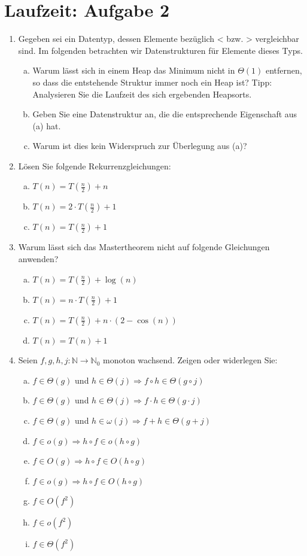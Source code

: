 \documentclass{scrartcl}
\begin{document}
\section*{Laufzeit: Aufgabe 2}
\begin{enumerate}[(1)]

\item Gegeben sei ein Datentyp, dessen Elemente bez\"uglich < bzw. > vergleichbar sind. Im folgenden betrachten wir Datenstrukturen f\"ur Elemente dieses Typs.
\begin{enumerate}[(a)]
\item Warum l\"asst sich in einem Heap das Minimum nicht in $\Theta(1)$ entfernen, so dass die entstehende Struktur immer noch ein Heap ist? \newline
Tipp: Analysieren Sie die Laufzeit des sich ergebenden Heapsorts.
\item Geben Sie eine Datenstruktur an, die die entsprechende Eigenschaft aus (a) hat.
\item Warum ist dies kein Widerspruch zur \"Uberlegung aus (a)?
\end{enumerate}

\item L\"osen Sie folgende Rekurrenzgleichungen:
\begin{enumerate}[(a)]
\item $T(n)=T(\frac{n}{2})+n$
\item $T(n)=2\cdot T(\frac{n}{2})+1$
\item $T(n)=T(\frac{n}{2})+1$
\end{enumerate}

\item Warum l\"asst sich das Mastertheorem nicht auf folgende Gleichungen anwenden?
\begin{enumerate}[(a)]
\item $T(n)=T(\frac{n}{2})+\log(n)$
\item $T(n)=n\cdot T(\frac{n}{2})+1$
\item $T(n)=T(\frac{n}{2})+n\cdot(2-\cos(n))$
\item $T(n)=T(n)+1$
\end{enumerate}

\item Seien $f,g,h,j: \mathbb{N}\to\mathbb{N}_0$ monoton wachsend. Zeigen oder widerlegen Sie:
\begin{enumerate}[(a)]
\item $f\in\Theta(g)$ und $h\in\Theta(j)\Rightarrow f\circ h \in \Theta(g\circ j)$
\item $f\in\Theta(g)$ und $h\in\Theta(j)\Rightarrow f\cdot h \in \Theta(g\cdot j)$
\item $f\in\Theta(g)$ und $h\in\omega(j)\Rightarrow f + h \in \Theta(g + j)$
\item $f\in o(g)\Rightarrow h\circ f \in o(h\circ g)$
\item $f\in O(g)\Rightarrow h\circ f \in O(h\circ g)$
\item $f\in o(g)\Rightarrow h\circ f \in O(h\circ g)$
\item $f\in O(f^2)$
\item $f\in o(f^2)$
\item $f\in \Theta(f^2)$
\end{enumerate}


\end{enumerate}
\end{document}
